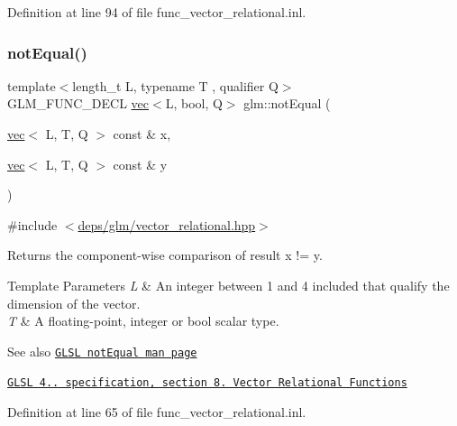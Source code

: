 Definition at line 94 of file func\+\_\+vector\+\_\+relational.\+inl.

\mbox{\label{group__core__func__vector__relational_gac5a72a973c81dc697dd8bb5d218e8251}} 
\subsubsection{\texorpdfstring{not\+Equal()}{notEqual()}}
{\footnotesize\ttfamily template$<$length\+\_\+t L, typename T , qualifier Q$>$ \\
G\+L\+M\+\_\+\+F\+U\+N\+C\+\_\+\+D\+E\+CL \hyperlink{structglm_1_1vec}{vec}$<$L, bool, Q$>$ glm\+::not\+Equal (\begin{DoxyParamCaption}\item[{\hyperlink{structglm_1_1vec}{vec}$<$ L, T, Q $>$ const \&}]{x,  }\item[{\hyperlink{structglm_1_1vec}{vec}$<$ L, T, Q $>$ const \&}]{y }\end{DoxyParamCaption})}



{\ttfamily \#include $<$\hyperlink{vector__relational_8hpp}{deps/glm/vector\+\_\+relational.\+hpp}$>$}

Returns the component-\/wise comparison of result x != y.


\begin{DoxyTemplParams}{Template Parameters}
{\em L} & An integer between 1 and 4 included that qualify the dimension of the vector. \\
\hline
{\em T} & A floating-\/point, integer or bool scalar type.\\
\hline
\end{DoxyTemplParams}
\begin{DoxySeeAlso}{See also}
\href{http://www.opengl.org/sdk/docs/manglsl/xhtml/notEqual.xml}{\tt G\+L\+SL not\+Equal man page} 

\href{http://www.opengl.org/registry/doc/GLSLangSpec.4.20.8.pdf}{\tt G\+L\+SL 4.. specification, section 8. Vector Relational Functions} 
\end{DoxySeeAlso}


Definition at line 65 of file func\+\_\+vector\+\_\+relational.\+inl.

